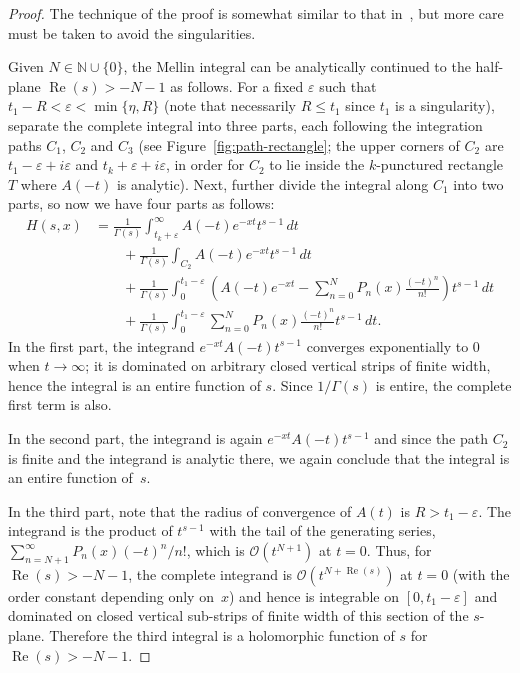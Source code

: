 \documentclass[11pt,a4paper]{amsart}
\newcommand{\N}{\mathbb{N}}
\newcommand{\calO}{\mathcal{O}}
\newcommand{\eps}{\varepsilon}
\renewcommand{\Re}{\operatorname{Re}}
\theoremstyle{plain}
\theoremstyle{plain}
\theoremstyle{remark}
\numberwithin{equation}{section}
\begin{document}
\begin{proof}
The technique of the proof is somewhat similar to that in~\cite{NRV}, but more care must be taken to avoid the singularities.

Given $N \in \N \cup \{0\}$, the Mellin integral can be analytically continued to the half-plane $\Re(s) > -N-1$ as follows. For a fixed $\eps$ such that $t_1-R < \eps < \min\{\eta,R\}$ (note that necessarily $R \le t_1$ since $t_1$ is a singularity), separate the complete integral into three parts, each following the integration paths $C_1$, $C_2$ and $C_3$ (see Figure~\ref{fig:path-rectangle}; the upper corners of $C_2$ are $t_1-\eps+i\eps$ and $t_k+\eps+i\eps$, in order for $C_2$ to lie inside the $k$-punctured rectangle $T$ where $A(-t)$ is analytic). 
Next, further divide the integral along $C_1$ into two parts, so now we have four parts as follows:
\begin{equation}
\label{eq:parts}
\begin{aligned}
  H(s,x) &= \frac{1}{\Gamma(s)} \int_{t_k+\eps}^{\infty} A(-t) e^{-xt}t^{s-1}\,dt \\
  & \qquad + \frac{1}{\Gamma(s)} \int_{C_2} A(-t) e^{-xt}t^{s-1}\,dt 
\\
& \qquad + \frac{1}{\Gamma(s)} \int_0^{t_1-\eps} \left( A(-t) e^{-xt}
  - \sum_{n=0}^N P_{n}(x)\frac{(-t)^n}{n!} \right)t^{s-1}\,dt \\
  & \qquad + \frac{1}{\Gamma(s)} \int_0^{t_1-\eps} \sum_{n=0}^N P_{n}(x) 
  \frac{(-t)^n}{n!}t^{s-1} \,dt.
\end{aligned}
\end{equation}
In the first part, the integrand $e^{-xt}A(-t)t^{s-1}$ converges exponentially to $0$ when $t \to \infty$; it is dominated on arbitrary closed vertical strips of finite width, hence the integral is an entire function of $s$. Since $1/\Gamma(s)$ is entire, the complete first term is also.

In the second part, the integrand is again $e^{-xt}A(-t)t^{s-1}$ and since the path $C_2$ is finite and the integrand is analytic there, we again conclude that the integral is an entire function of~$s$. 

In the third part, note that the radius of convergence of $A(t)$ is $R>t_1-\eps$. The integrand is the product of $t^{s-1}$ with the tail of the generating series, $\sum_{n=N+1}^{\infty} P_{n}(x) (-t)^{n}/n!$, which is $\calO(t^{N+1})$ at $t=0$. Thus, for $\Re(s) > -N-1$, the complete integrand is $\calO(t^{N+\Re(s)})$ at $t=0$ (with the order constant depending only on~$x$) and hence is integrable on $[0,t_1-\eps]$ and dominated on closed vertical sub-strips of finite width of this section of the $s$-plane. Therefore the third integral is a holomorphic function of $s$ for $\Re(s) > -N-1$.


\end{proof}
\end{document}
